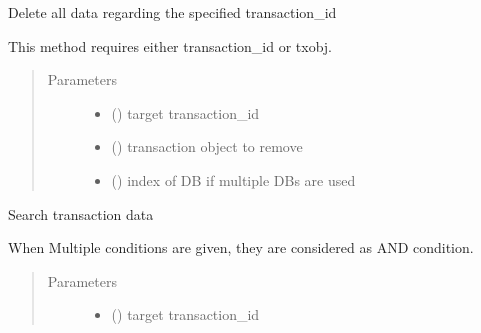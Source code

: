 \documentclass[letterpaper,10pt,english]{sphinxmanual}
\begin{document}
\begin{fulllineitems}
\begin{fulllineitems}
\end{fulllineitems}


\begin{fulllineitems}
\label{\detokenize{bbc1.core.data_handler:bbc1.core.data_handler.DataHandlerDomain0.remove}}
Delete all data regarding the specified transaction\_id

This method requires either transaction\_id or txobj.
\begin{quote}\begin{description}
\item[{Parameters}] \leavevmode\begin{itemize}
\item {} 
 () \textendash{} target transaction\_id

\item {} 
 ({\hyperref[\detokenize{bbc1.core.bbclib:bbc1.core.bbclib.BBcTransaction}]{}}) \textendash{} transaction object to remove

\item {} 
 () \textendash{} index of DB if multiple DBs are used

\end{itemize}

\end{description}\end{quote}

\end{fulllineitems}


\begin{fulllineitems}
\label{\detokenize{bbc1.core.data_handler:bbc1.core.data_handler.DataHandlerDomain0.search_transaction}}
Search transaction data

When Multiple conditions are given, they are considered as AND condition.
\begin{quote}\begin{description}
\item[{Parameters}] \leavevmode\begin{itemize}
\item {} 
 () \textendash{} target transaction\_id


\end{itemize}
\end{description}
\end{quote}
\end{fulllineitems}
\end{fulllineitems}
\end{document}
